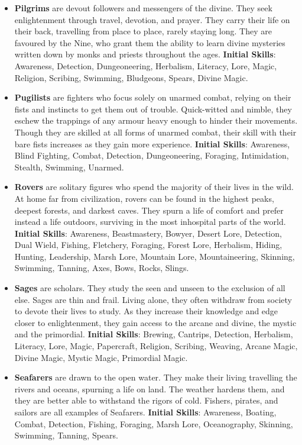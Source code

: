 \begin{itemize}
\item {\bf Pilgrims} are devout followers and messengers of the divine.  
They seek enlightenment through travel, devotion, and prayer.  They carry 
their life on their back, travelling from place to place, rarely staying 
long.  They are favoured by the Nine, who grant them the ability to learn
divine mysteries written down by monks and priests throughout the ages.
\textbf{Initial Skills}: Awareness, Detection, Dungeoneering, Herbalism,
Literacy, Lore, Magic, Religion, Scribing, Swimming, Bludgeons, Spears,
Divine Magic.

\item {\bf Pugilists} are fighters who focus solely on unarmed combat, 
relying on their fists and instincts to get them out of trouble.  
Quick-witted and nimble, they eschew the trappings of any armour heavy 
enough to hinder their movements.  Though they are skilled at all forms of
unarmed combat, their skill with their bare fists increases as they gain
more experience.  \textbf{Initial Skills}: Awareness, Blind Fighting, 
Combat, Detection, Dungeoneering, Foraging, Intimidation, Stealth, 
Swimming, Unarmed.

\item {\bf Rovers} are solitary figures who spend the majority of their 
lives in the wild.  At home far from civilization, rovers can be found in 
the highest peaks, deepest forests, and darkest caves.  They spurn a life 
of comfort and prefer instead a life outdoors, surviving in the most 
inhospital parts of the world.  \textbf{Initial Skills}: Awareness,
Beastmastery, Bowyer, Desert Lore, Detection, Dual Wield, Fishing, 
Fletchery, Foraging, Forest Lore, Herbalism, Hiding, Hunting, Leadership, 
Marsh Lore, Mountain Lore, Mountaineering, Skinning, Swimming, Tanning, 
Axes, Bows, Rocks, Slings.

\item {\bf Sages} are scholars.  They study the seen and unseen to the 
exclusion of all else.  Sages are thin and frail.  Living alone, they often
withdraw from society to devote their lives to study.  As they increase 
their knowledge and edge closer to enlightenment, they gain access to the 
arcane and divine, the mystic and the primordial.  \textbf{Initial Skills}:
Brewing, Cantrips, Detection, Herbalism, Literacy, Lore, Magic, Papercraft,
Religion, Scribing, Weaving, Arcane Magic, Divine Magic, Mystic Magic,
Primordial Magic.

\item {\bf Seafarers} are drawn to the open water.  They make their living 
travelling the rivers and oceans, spurning a life on land.  The weather 
hardens them, and they are better able to withstand the rigors of cold.  
Fishers, pirates, and sailors are all examples of Seafarers.
\textbf{Initial Skills}: Awareness, Boating, Combat, Detection, Fishing,
Foraging, Marsh Lore, Oceanography, Skinning, Swimming, Tanning, Spears.


\end{itemize}

